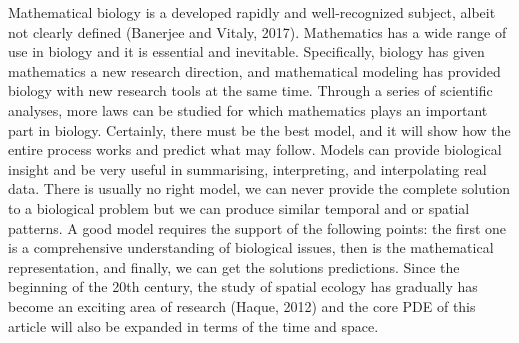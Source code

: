 \documentclass[12pt]{article}
\begin{document}
\noindent Mathematical biology is a developed rapidly and well-recognized subject, albeit not clearly defined (Banerjee and Vitaly, 2017). Mathematics has a wide range of use in biology and it is essential and inevitable. Specifically, biology has given mathematics a new research direction, and mathematical modeling has provided biology with new research tools at the same time. Through a series of scientific analyses, more laws can be studied for which mathematics plays an important part in biology. Certainly, there must be the best model, and it will show how the entire process works and predict what may follow. Models can provide biological insight and be very useful in summarising, interpreting, and interpolating real data. There is usually no right model, we can never provide the complete solution to a biological problem but we can produce similar temporal and or spatial patterns. A good model requires the support of the following points: the first one is a comprehensive understanding of biological issues, then is the mathematical representation, and finally, we can get the solutions predictions. Since the beginning of the 20th century, the study of spatial ecology has gradually has become an exciting area of research (Haque, 2012) and the core PDE of this article will also be expanded in terms of the time and space.
\vspace{24pt}
\end{document}
